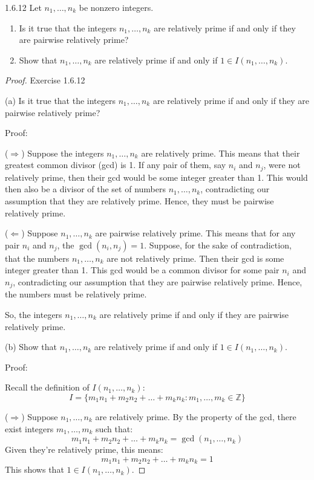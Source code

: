 \documentclass[12pt]{amsart}
\theoremstyle{definition}
\numberwithin{equation}{section}
\theoremstyle{plain}
\newcommand{\Z}{\mathbb{Z}}
\begin{document}
\begin{exercise}{1.6.12}
    Let $n_1, \dots, n_k$ be nonzero integers.

    \begin{enumerate}[label=(\alph*.)]
        \item Is it true that the integers $n_1, \dots, n_k$ are relatively prime if and only if they are pairwise relatively prime?
        \item Show that $n_1, \dots, n_k$ are relatively prime if and only if $1 \in I(n_1, \dots, n_k)$. 
    \end{enumerate}
    
    \begin{proof}
        Exercise 1.6.12

(a) Is it true that the integers \( n_1, \dots, n_k \) are relatively prime if and only if they are pairwise relatively prime?

Proof:

($\Rightarrow$) Suppose the integers \( n_1, \dots, n_k \) are relatively prime. This means that their greatest common divisor (gcd) is 1. If any pair of them, say \( n_i \) and \( n_j \), were not relatively prime, then their gcd would be some integer greater than 1. This would then also be a divisor of the set of numbers \( n_1, \dots, n_k \), contradicting our assumption that they are relatively prime. Hence, they must be pairwise relatively prime.

($\Leftarrow$) Suppose \( n_1, \dots, n_k \) are pairwise relatively prime. This means that for any pair \( n_i \) and \( n_j \), the \(\gcd(n_i, n_j) = 1\). Suppose, for the sake of contradiction, that the numbers \( n_1, \dots, n_k \) are not relatively prime. Then their gcd is some integer greater than 1. This gcd would be a common divisor for some pair \( n_i \) and \( n_j \), contradicting our assumption that they are pairwise relatively prime. Hence, the numbers must be relatively prime.

So, the integers \( n_1, \dots, n_k \) are relatively prime if and only if they are pairwise relatively prime.

(b) Show that \( n_1, \dots, n_k \) are relatively prime if and only if \( 1 \in I(n_1, \dots, n_k) \).

Proof:

Recall the definition of \( I(n_1, \dots, n_k) \):
\[ I = \{m_1n_1 + m_2n_2 + \dots + m_kn_k : m_1, \dots, m_k \in \Z \} \]

($\Rightarrow$) Suppose \( n_1, \dots, n_k \) are relatively prime. By the property of the gcd, there exist integers \( m_1, \dots, m_k \) such that:
\[ m_1n_1 + m_2n_2 + \dots + m_kn_k = \gcd(n_1, \dots, n_k) \]
Given they're relatively prime, this means:
\[ m_1n_1 + m_2n_2 + \dots + m_kn_k = 1 \]
This shows that \( 1 \in I(n_1, \dots, n_k) \).


\end{proof}
\end{exercise}
\end{document}
